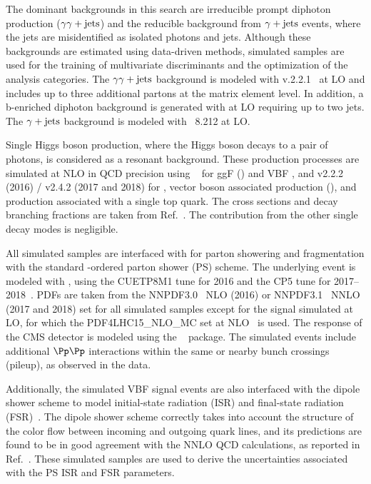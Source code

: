 \documentclass[11pt,twoside,a4paper,cmspaper,final,collab]{cms-tdr}
\begin{document}
The dominant backgrounds in this search are irreducible prompt diphoton production ($\gamma\gamma+\text{jets}$) and the reducible background from $\gamma+\text{jets}$ events, where the jets are misidentified as isolated photons and {\cPqb} jets. Although these backgrounds are estimated using data-driven methods, simulated samples are used for the training of multivariate discriminants and the optimization of the analysis categories. The $\gamma\gamma+\text{jets}$ background is modeled with \SHERPA
v.2.2.1~\cite{Gleisberg:2008ta} at LO and includes up to three additional
partons at the matrix element level. In addition, a b-enriched diphoton background is generated with \SHERPA at LO requiring up to two {\cPqb} jets.
The $\gamma+\text{jets}$ background is modeled with \PYTHIA~8.212 \cite{Sjostrand:2014zea} at LO.

Single Higgs boson production, where the Higgs boson decays to a pair of photons, is considered as a resonant background. These production processes are simulated at NLO in QCD precision using ~\cite{Nason:2004rx, POWHEG_Frixione:2007vw, Alioli:2010xd, Bagnaschi:2011tu} for ggF \PH (\ggH) and VBF \PH, and \MGvATNLO v2.2.2 (2016) / v2.4.2 (2017 and 2018) for \ttH, vector boson associated production (\VH), and production associated with a single top quark. The cross sections and decay branching fractions are
taken from Ref.~\cite{deFlorian:2016spz}. The contribution from the other single \PH decay modes is negligible.  

All simulated samples are interfaced with \PYTHIA for parton showering and fragmentation with the standard \pt-ordered parton shower (PS) scheme. The underlying event is modeled with \PYTHIA, using the CUETP8M1 tune for 2016 and the CP5 tune for 2017--2018~\cite{Khachatryan:2015pea, Sirunyan:2019dfx}. PDFs are taken from the NNPDF3.0~\cite{Ball:2014uwa} NLO (2016) or NNPDF3.1~\cite{Ball:2017} NNLO (2017 and 2018) set for all simulated samples except for the signal simulated at LO, for which the {PDF4LHC15\_NLO\_MC} set at NLO~\cite{Carrazza:2015hva, Butterworth:2015oua, Dulat:2015mca, Harland-Lang:2014zoa, Ball:2014uwa} is used. The response of the CMS detector is modeled using the \GEANTfour~\cite{Agostinelli:2002hh} package. The simulated events include additional $\Pp\Pp$ interactions within the same or nearby bunch crossings (pileup), as observed in the data.

Additionally, the simulated VBF \HH signal events are also interfaced with the \PYTHIA dipole shower scheme to model initial-state radiation (ISR) and final-state radiation (FSR)~\cite{Cabouat_2018}. The dipole shower scheme correctly takes into account the structure of the color flow between incoming and outgoing quark lines, and its predictions are found to be in good agreement with the NNLO QCD calculations, as reported in Ref.~\cite{Jager:2020hkz}. These simulated samples are used to derive the uncertainties associated with the \PYTHIA PS ISR and FSR parameters.
\end{document}
